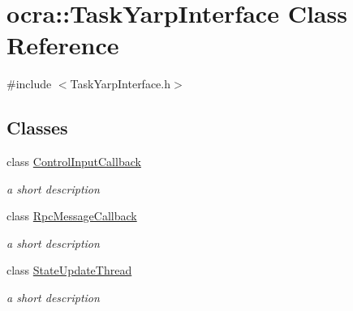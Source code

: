 \hypertarget{classocra_1_1TaskYarpInterface}{}\section{ocra\+:\+:Task\+Yarp\+Interface Class Reference}
\label{classocra_1_1TaskYarpInterface}


{\ttfamily \#include $<$Task\+Yarp\+Interface.\+h$>$}

\subsection*{Classes}
\begin{DoxyCompactItemize}
\item 
class \hyperlink{classocra_1_1TaskYarpInterface_1_1ControlInputCallback}{Control\+Input\+Callback}
\begin{DoxyCompactList}\small\item\em a short description \end{DoxyCompactList}\item 
class \hyperlink{classocra_1_1TaskYarpInterface_1_1RpcMessageCallback}{Rpc\+Message\+Callback}
\begin{DoxyCompactList}\small\item\em a short description \end{DoxyCompactList}\item 
class \hyperlink{classocra_1_1TaskYarpInterface_1_1StateUpdateThread}{State\+Update\+Thread}
\begin{DoxyCompactList}\small\item\em a short description \end{DoxyCompactList}\end{DoxyCompactItemize}
